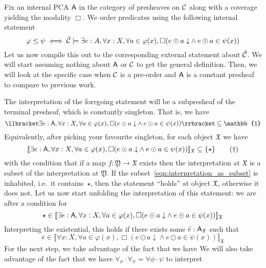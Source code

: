 \documentclass[12pt]{article}
\begin{document}
\newpage

Fix an internal PCA \(\mathsf{A}\) in the category of presheaves on \(\mathcal{C}\) along with a
coverage yielding the modality \(\Box\). We order predicates using the
following internal statement
\[
  \varphi \leq \psi
  \iff
  \hat{\mathcal{C}} \models
    \exists e : A,
    \forall x : X,
    \forall a \in \varphi(x),
    \Box ({e \odot a \downarrow} \land e \odot a \in \psi(x))
\]
Let us now compile this out to the corresponding external statement about
\(\hat{\mathcal{C}}\). We will start assuming nothing about \(\mathsf{A}\) or
\(\mathcal{C}\) to get the general definition. Then, we will look at the specific
case when \(\mathcal{C}\) is a pre-order and \(\mathsf{A}\) is a constant presheaf to compare
to previous work.

The interpretation of the foregoing statement will be a subpresheaf of
the terminal presheaf, which is constantly singleton. That is,
we have
\[
 \llbracket
    \exists e : \A,
    \forall x : X,
    \forall a \in \varphi(x),
    \Box ({e \odot a \downarrow} \land e \odot a \in \psi(x))
  \rrbracket \subseteq \mathbb{1}
\]
Equivalently, after picking your favourite singleton, for each object \(\mathfrak{X}\) we
have
\begin{equation}\label{eqn:interpretation_as_subset}
 \llbracket
    \exists e : \mathsf{A},
    \forall x : X,
    \forall a \in \varphi(x),
    \Box ({e \odot a \downarrow} \land e \odot a \in \psi(x))
  \rrbracket_{\mathfrak{X}} \subseteq \{\star\}\tag{\(\dagger\)}
\end{equation}
with the condition that if a map \(f : \mathfrak{Y} \to \mathfrak{X}\) exists
then the interpretation at \(\mathfrak{X}\) is a subset of the interpretation at
\(\mathfrak{Y}\). If the subset~\ref{eqn:interpretation_as_subset} is inhabited,
i.e.\ it contains~\(\star\), then the statement ``holds'' at object
\(\mathfrak{X}\), otherwise it does not. Let us now start unfolding the
interpretation of this statement: we are after a condition for
\[
 \star \in \llbracket
    \exists e : \mathsf{A},
    \forall x : X,
    \forall a \in \varphi(x),
    \Box ({e \odot a \downarrow} \land e \odot a \in \psi(x))
  \rrbracket_{\mathfrak{X}}
\]
Interpreting the existential, this holds if there exists some
\(\bar{e} : \mathsf{A}_{\mathfrak{X}}\) such that
\[
 \bar{e} \in \llbracket
    \forall x : X,
    \forall a \in \varphi(x),
    \Box ({e \odot a \downarrow} \land e \odot a \in \psi(x))
  \rrbracket_{\mathfrak{X}}
\]
For the next step, we take advantage of the fact that we have We will also take
advantage of the fact that we have
\(\forall_{\phi} \cdot \forall_{\psi} = \forall{\phi \cdot \psi}\) to interpret
\end{document}

